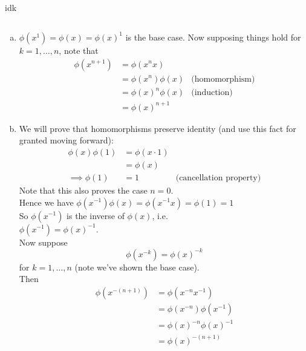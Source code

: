 \documentclass{article}
\newcommand{\inv}[1]{ {#1}^{-1} }
\begin{document}
\subsubsection{}
idk
\subsection{}
\subsubsection{}\label{ex6p1}
\begin{enumerate}[(a)]
\item $\phi(x^1) = \phi(x) = \phi(x)^1$ is the base case. Now supposing things hold for $k=1,\ldots,n$, note that\\
\begin{align*}
\phi(x^{n+1}) &= \phi(x^nx)\\
&= \phi(x^n)\phi(x) & \mbox{(homomorphism)}\\
&= \phi(x)^n\phi(x) & \mbox{(induction)}\\
&= \phi(x)^{n+1}
\end{align*}
\item
We will prove that homomorphisms preserve identity (and use this fact for granted moving forward):
\begin{align*}
\phi(x)\phi(1) &= \phi(x\cdot 1)\\
&= \phi(x)\\
\implies \phi(1) &= 1 & \mbox{(cancellation property)}
\end{align*}
Note that this also proves the case $n=0$.\\
Hence we have
$\phi(\inv{x})\phi(x) = \phi(\inv{x}x) = \phi(1) = 1$\\
So $\phi(\inv{x})$ is the inverse of $\phi(x)$, i.e.\\
$\phi(\inv{x}) = \inv{\phi(x)}$.\\
Now suppose
\begin{equation*}
\phi(x^{-k}) = \phi(x)^{-k}
\end{equation*}
for $k=1,\ldots,n$ (note we've shown the base case).\\
Then\\
\begin{align*}
\phi(x^{-(n+1)}) &= \phi(x^{-n}\inv{x})\\
&= \phi(x^{-n})\phi(\inv{x})\\
&= \phi(x)^{-n}\inv{\phi(x)}\\
&= \phi(x)^{-(n+1)}
\end{align*}
\end{enumerate}
\end{document}
